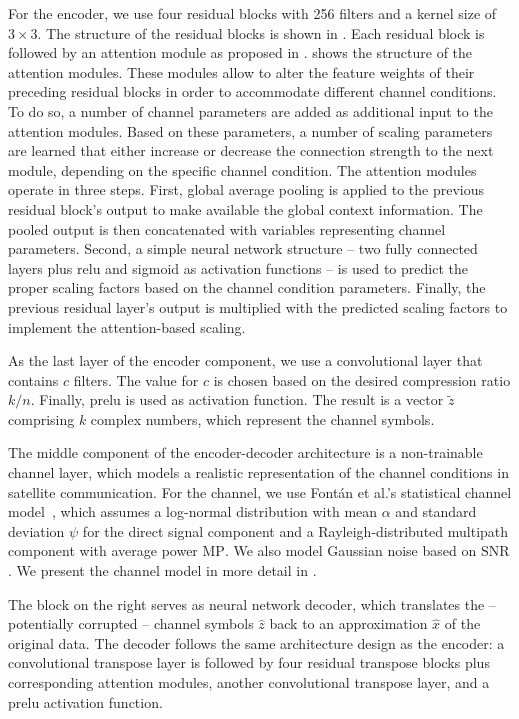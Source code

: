 \documentclass[conference]{IEEEtran}
\newcommand\MP{\ensuremath{\mathrm{MP}}\xspace}
\newcommand\SNR{\ensuremath{\mathrm{SNR}}\xspace}
\begin{document}
For the encoder, we use four residual blocks with 256 filters and a kernel size of $3 \times 3$.
The structure of the residual blocks is shown in .
Each residual block is followed by an attention module as proposed in \cite{wireless-attention-modules}.
 shows the structure of the attention modules.
These modules allow to alter the feature weights of their preceding residual blocks in order to accommodate different channel conditions.
To do so, a number of channel parameters are added as additional input to the attention modules.
Based on these parameters, a number of scaling parameters are learned that either increase or decrease the connection strength to the next module, depending on the specific channel condition.
The attention modules operate in three steps.
First, global average pooling is applied to the previous residual block's output to make available the global context information.
The pooled output is then concatenated with variables representing channel parameters.
Second, a simple neural network structure -- two fully connected layers plus \ac{relu} and sigmoid as activation functions -- is used to predict the proper scaling factors based on the channel condition parameters.
Finally, the previous residual layer's output is multiplied with the predicted scaling factors to implement the attention-based scaling.

As the last layer of the encoder component, we use a convolutional layer that contains $c$ filters.
The value for $c$ is chosen based on the desired compression ratio $k/n$.
Finally, \ac{prelu} is used as activation function.
The result is a vector $\tilde{z}$ comprising $k$ complex numbers, which represent the channel symbols.

The middle component of the encoder-decoder architecture is a non-trainable channel layer, which models a realistic representation of the channel conditions in satellite communication.
For the channel, we use Fontán et al.'s statistical channel model~\cite{966585}, which assumes a log-normal distribution with mean $\alpha$ and standard deviation $\psi$ for the direct signal component and a Rayleigh-distributed multipath component with average power \MP. We also model Gaussian noise based on \SNR.
We present the channel model in more detail in .

The block on the right serves as neural network decoder, which translates the -- potentially corrupted -- channel symbols $\hat{z}$ back to an approximation $\hat{x}$ of the original data.
The decoder follows the same architecture design as the encoder: a convolutional transpose layer is followed by four residual transpose blocks plus corresponding attention modules,  another convolutional transpose layer, and a \ac{prelu} activation function.
\end{document}
